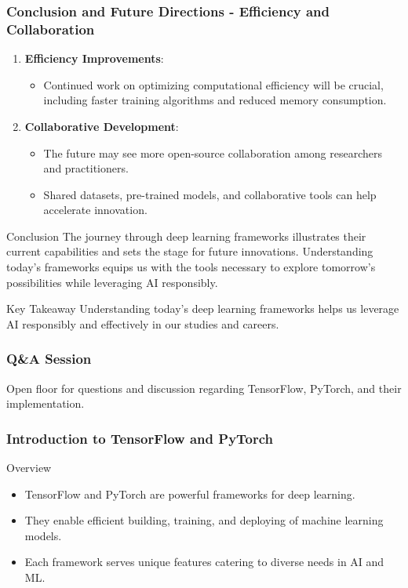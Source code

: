 \documentclass[aspectratio=169]{beamer}
\begin{document}
\begin{frame}[fragile]
    \frametitle{Conclusion and Future Directions - Efficiency and Collaboration}
    
    \begin{enumerate}[resume]
        \item \textbf{Efficiency Improvements}:
        \begin{itemize}
            \item Continued work on optimizing computational efficiency will be crucial, including faster training algorithms and reduced memory consumption.
        \end{itemize}

        \item \textbf{Collaborative Development}:
        \begin{itemize}
            \item The future may see more open-source collaboration among researchers and practitioners.
            \item Shared datasets, pre-trained models, and collaborative tools can help accelerate innovation.
        \end{itemize}
    \end{enumerate}

    \begin{block}{Conclusion}
        The journey through deep learning frameworks illustrates their current capabilities and sets the stage for future innovations. Understanding today's frameworks equips us with the tools necessary to explore tomorrow's possibilities while leveraging AI responsibly.
    \end{block}
    
    \begin{block}{Key Takeaway}
        Understanding today's deep learning frameworks helps us leverage AI responsibly and effectively in our studies and careers.
    \end{block}
\end{frame}

\begin{frame}
    \frametitle{Q\&A Session}
    Open floor for questions and discussion regarding TensorFlow, PyTorch, and their implementation.
\end{frame}

\begin{frame}
    \frametitle{Introduction to TensorFlow and PyTorch}
    \begin{block}{Overview}
        \begin{itemize}
            \item TensorFlow and PyTorch are powerful frameworks for deep learning.
            \item They enable efficient building, training, and deploying of machine learning models.
            \item Each framework serves unique features catering to diverse needs in AI and ML.
        \end{itemize}
    \end{block}
\end{frame}
\end{document}
